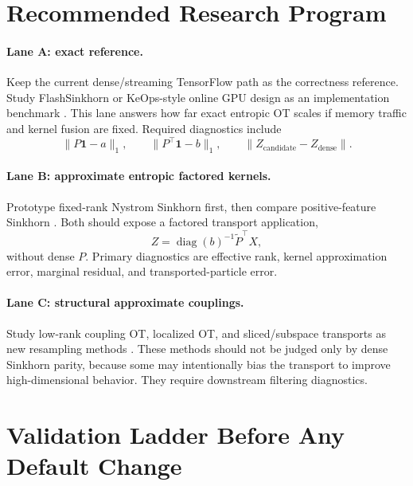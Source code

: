 \documentclass[11pt]{article}
\newcommand{\ones}{\mathbf{1}}
\newcommand{\diag}{\operatorname{diag}}
\begin{document}
\section{Recommended Research Program}

\paragraph{Lane A: exact reference.}
Keep the current dense/streaming TensorFlow path as the correctness reference.
Study FlashSinkhorn or KeOps-style online GPU design as an implementation
benchmark \citep{charlier2021keops,ye2026flashsinkhorn,xiao2026fastsinkhorn}.
This lane answers how far exact entropic OT scales if memory traffic and kernel
fusion are fixed.  Required diagnostics include
\begin{equation}
\|P\ones-a\|_1,
\qquad
\|P^\top\ones-b\|_1,
\qquad
\|Z_{\mathrm{candidate}}-Z_{\mathrm{dense}}\|.
\label{eq:exact-diagnostics}
\end{equation}

\paragraph{Lane B: approximate entropic factored kernels.}
Prototype fixed-rank Nystrom Sinkhorn first, then compare positive-feature
Sinkhorn \citep{altschuler2019nystrom,scetbon2020positivefeatures}.  Both
should expose a factored transport application,
\begin{equation}
Z
=
\diag(b)^{-1}
\tilde P^\top X,
\label{eq:factored-entropic-Z}
\end{equation}
without dense $P$.  Primary diagnostics are effective rank, kernel
approximation error, marginal residual, and transported-particle error.

\paragraph{Lane C: structural approximate couplings.}
Study low-rank coupling OT, localized OT, and sliced/subspace transports as new
resampling methods
\citep{forrow2019factored,scetbon2021lowrank,scetbon2022lowrank,paty2019subspace,nguyen2025sliced}.
These methods should not be judged only by dense Sinkhorn parity, because some
may intentionally bias the transport to improve high-dimensional behavior.
They require downstream filtering diagnostics.

\section{Validation Ladder Before Any Default Change}
\end{document}
